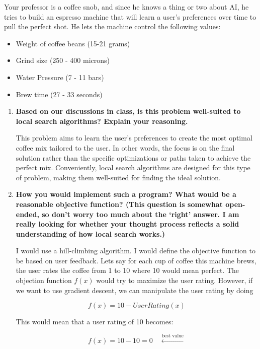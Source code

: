 \documentclass[a4paper]{article}
\begin{document}
\begin{sloppypar}
Your professor is a coffee snob, and since he knows a thing or two about AI, he tries to
build an espresso machine that will learn a user’s preferences over time to pull the perfect
shot. He lets the machine control the following values:

\begin{itemize}
    \item Weight of coffee beans (15-21 grams)
    \item Grind size (250 - 400 microns)
    \item Water Pressure (7 - 11 bars)
    \item Brew time (27 - 33 seconds)
\end{itemize}

\begin{enumerate}[start=9,label=Q\arabic*,left=0pt]
    \item \textbf{Based on our discussions in class, is this problem well-suited to local search algorithms? Explain your reasoning.}
    \par This problem aims to learn the user’s preferences to create the most optimal coffee mix tailored to the user. 
    In other words, the focus is on the final solution rather than the specific optimizations or paths taken to achieve the perfect mix. 
    Conveniently, local search algorithms are designed for this type of problem, making them well-suited for finding the ideal solution.
    
    \item \textbf{How you would implement such a program? What would be a reasonable objective function? (This question is somewhat open-ended, so don’t worry too much about the ‘right’ answer. I am really looking for whether your thought process reflects a solid understanding of how local search works.)}
    \par I would use a hill-climbing algorithm. I would define the objective function to be based on user feedback.
    Lets say for each cup of coffee this machine brews, the user rates the coffee from 1 to 10 where 10 would mean perfect.
    The objection function $f(x)$ would try to maximize the user rating. However, if we want to use gradient descent, we can manipulate the 
    user rating by doing 
    
    \[ f(x) = 10 - User Rating(x) \]

    This would mean that a user rating of 10 becomes:

    \[ f(x) = 10 - 10 = 0 \quad \xleftarrow{\text{best value}} \]


\end{enumerate}
\end{sloppypar}
\end{document}
